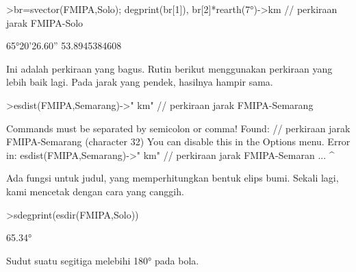 \documentclass[a4paper,10pt]{article}
\begin{document}
\begin{eulernotebook}
\begin{eulercomment}
\begin{eulercomment}
\begin{eulercomment}
\begin{eulercomment}
\begin{eulercomment}
\begin{eulercomment}
\begin{eulercomment}
\begin{eulercomment}
\begin{eulercomment}
\begin{eulercomment}
\begin{eulercomment}
\begin{eulercomment}
\begin{eulercomment}
\begin{eulercomment}
\begin{eulercomment}
\begin{eulercomment}
\begin{eulercomment}
\begin{eulercomment}
\begin{eulercomment}
\begin{eulercomment}
\begin{eulercomment}
\begin{eulercomment}
\begin{eulercomment}
\begin{eulercomment}
\begin{eulercomment}
\begin{eulercomment}
\begin{eulercomment}
\begin{eulercomment}
\begin{eulercomment}
\begin{eulercomment}
\begin{eulercomment}
\begin{eulercomment}
\begin{eulercomment}
\begin{eulercomment}
\begin{eulercomment}
\end{eulercomment}
\begin{eulerprompt}
>br=svector(FMIPA,Solo); degprint(br[1]), br[2]*rearth(7°)->km // perkiraan jarak FMIPA-Solo
\end{eulerprompt}
\begin{euleroutput}
  65°20'26.60''
  53.8945384608
\end{euleroutput}
\begin{eulercomment}
Ini adalah perkiraan yang bagus. Rutin berikut menggunakan perkiraan
yang lebih baik lagi. Pada jarak yang pendek, hasilnya hampir sama.
\end{eulercomment}
\begin{eulerprompt}
>esdist(FMIPA,Semarang)->" km" // perkiraan jarak FMIPA-Semarang
\end{eulerprompt}
\begin{euleroutput}
  Commands must be separated by semicolon or comma!
  Found:  // perkiraan jarak FMIPA-Semarang (character 32)
  You can disable this in the Options menu.
  Error in:
  esdist(FMIPA,Semarang)->" km" // perkiraan jarak FMIPA-Semaran ...
                               ^
\end{euleroutput}
\begin{eulercomment}
Ada fungsi untuk judul, yang memperhitungkan bentuk elips bumi. Sekali
lagi, kami mencetak dengan cara yang canggih.
\end{eulercomment}
\begin{eulerprompt}
>sdegprint(esdir(FMIPA,Solo))
\end{eulerprompt}
\begin{euleroutput}
       65.34°
\end{euleroutput}
\begin{eulercomment}
Sudut suatu segitiga melebihi 180° pada bola.
\end{eulercomment}

\end{eulercomment}
\end{eulercomment}
\end{eulercomment}
\end{eulercomment}
\end{eulercomment}
\end{eulercomment}
\end{eulercomment}
\end{eulercomment}
\end{eulercomment}
\end{eulercomment}
\end{eulercomment}
\end{eulercomment}
\end{eulercomment}
\end{eulercomment}
\end{eulercomment}
\end{eulercomment}
\end{eulercomment}
\end{eulercomment}
\end{eulercomment}
\end{eulercomment}
\end{eulercomment}
\end{eulercomment}
\end{eulercomment}
\end{eulercomment}
\end{eulercomment}
\end{eulercomment}
\end{eulercomment}
\end{eulercomment}
\end{eulercomment}
\end{eulercomment}
\end{eulercomment}
\end{eulercomment}
\end{eulercomment}
\end{eulercomment}
\end{eulernotebook}
\end{document}
